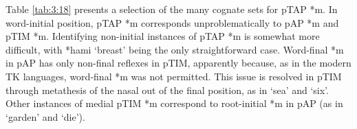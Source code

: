 Table \ref{tab:3:18} presents a selection of the many cognate sets for pTAP *m. In word-initial position, pTAP *m corresponds unproblematically to pAP *m and pTIM *m. Identifying non-initial instances of pTAP *m is somewhat more difficult, with *hami `breast' being the only straightforward case. Word-final *m in pAP has only non-final reflexes in pTIM, apparently because, as in the modern TK languages, word-final *m was not permitted. This issue is resolved in pTIM through metathesis of the nasal out of the final position, as in `sea' and `six'. Other instances of medial pTIM *m correspond to root-initial *m in pAP (as in `garden' and `die'). 
 
